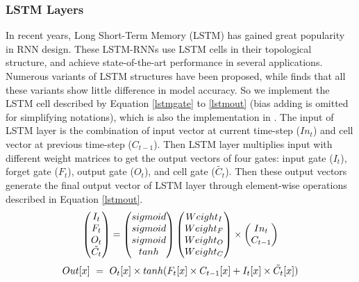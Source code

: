 \documentclass{acm_proc_article-sp-copy}
\begin{document}
\subsubsection{LSTM Layers}
In recent years, Long Short-Term Memory (LSTM) has gained great popularity in RNN design. These LSTM-RNNs use LSTM cells in their topological structure, and achieve state-of-the-art performance in several applications. Numerous variants of LSTM structures have been proposed, while \cite{lstmsum} finds that all these variants show little difference in model accuracy. So we implement the LSTM cell described by Equation \ref{lstmgate} to \ref{lstmout} (bias adding is omitted for simplifying notations), which is also the implementation in \cite{lstm}. The input of LSTM layer is the combination of input vector at current time-step ($In_t$) and cell vector at previous time-step ($C_{t-1}$). Then LSTM layer multiplies input with different weight matrices to get the output vectors of four gates: input gate ($I_t$), forget gate ($F_t$), output gate ($O_t$), and cell gate ($\tilde{C_t}$). Then these output vectors generate the final output vector of LSTM layer through element-wise operations described in Equation \ref{lstmout}.
\vspace{-5pt}
\begin{equation}
\centering
\begin{pmatrix}
I_t\\
F_t\\
O_t\\
\tilde{C_t}\\
\end{pmatrix}
=
\begin{pmatrix}
sigmoid\\
sigmoid\\
sigmoid\\
tanh   \\
\end{pmatrix}
\begin{pmatrix}
Weight_I\\
Weight_F\\
Weight_O\\
Weight_C\\
\end{pmatrix}
\times
\begin{pmatrix}
In_t\\
C_{t-1}\\
\end{pmatrix}
\label{lstmgate}
\end{equation}
\vspace{-10pt}
\begin{equation}
\centering
Out[x]\ =\ O_t[x]\times tanh(F_t[x]\times C_{t-1}[x]+I_t[x]\times \tilde{C_t}[x])
\label{lstmout}
\end{equation}
\end{document}
